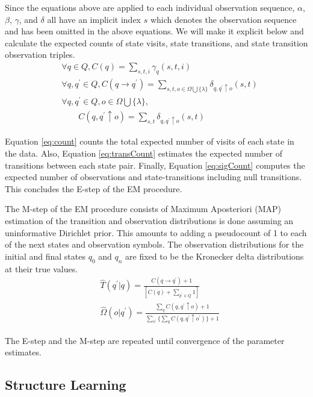 \documentclass[letterpaper]{article}
\begin{document}
Since the equations above are applied to each individual observation sequence, $\alpha$, $\beta$, $\gamma$, and $\delta$ all have an implicit index $s$ which denotes the observation sequence and has been omitted in the above equations. We will make it explicit below and calculate the expected counts of state visits, state transitions, and state transition observation triples.
{\footnotesize
\begin{align}
&\forall q \in Q, C(q) = \sum_{s,t,i} \gamma_q(s,t,i) \label{eq:count}\\
&\forall q, q^\prime \in Q, C(q \rightarrow q^\prime) = \sum_{s,t,o \in \Omega \bigcup \{\lambda\}} \delta_{q,q^\prime \uparrow o}(s,t) \label{eq:transCount}\\
&\forall q, q^\prime \in Q, o \in \Omega \bigcup \{\lambda\}, \label{eq:sigCount}\\
&\qquad C(q, q^\prime \uparrow o) = \sum_{s,t} \delta_{q,q^\prime \uparrow o}(s,t) \nonumber
\end{align}
}%



Equation \ref{eq:count} counts the total expected number of visits of each state in the data. Also, Equation \ref{eq:transCount} estimates the expected number of transitions between each state pair. Finally, Equation \ref{eq:sigCount} computes the expected number of observations and state-transitions including null transitions. This concludes the E-step of the EM procedure.


The M-step of the EM procedure consists of
Maximum Aposteriori (MAP) estimation of the
transition and observation distributions is done
assuming an uninformative Dirichlet prior. This
amounts to
adding a pseudocount of 1 to each of the next states and observation
symbols.
The observation distributions for the initial and final states $q_0$ and
$q_n$ are fixed to be the Kronecker delta distributions at their true values.
{\footnotesize
\begin{align}
&\hat{T}(q^\prime | q) = \frac{ C(q \rightarrow q^\prime) + 1}{[C(q)+ \sum_{p^{\prime} \in Q} 1]} \\
&\hat{\Omega}(o|q^\prime) = \frac {{\sum_{q} C(q, q^\prime \uparrow o)} + 1} {\sum_{o^\prime} \{ \sum_q C(q,q^\prime \uparrow o^\prime)\} + 1}
\end{align}
}%

The E-step and the M-step are repeated until convergence of the
parameter estimates.

\subsection{Structure Learning}
\label{struct}
\end{document}
